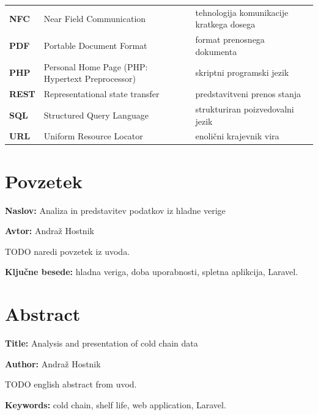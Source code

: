 \documentclass[a4paper, 12pt]{book}
\newcommand{\ttitle}{Analiza in predstavitev podatkov iz hladne verige}
\newcommand{\ttitleEn}{Analysis and presentation of cold chain data}
\newcommand{\tauthor}{Andraž Hostnik}
\newcommand{\tkeywords}{hladna veriga, doba uporabnosti, spletna aplikcija, Laravel}
\newcommand{\tkeywordsEn}{cold chain, shelf life, web application, Laravel}
\newcommand{\clearemptydoublepage}{\newpage{\pagestyle{empty}\cleardoublepage}}
\begin{document}
\begin{tabular}{p{}|p{}|p{}}
  {\bf NFC} & Near Field Communication & tehnologija komunikacije kratkega dosega \\
  {\bf PDF} & Portable Document Format & format prenosnega dokumenta \\
  {\bf PHP} & Personal Home Page (PHP: Hypertext Preprocessor) & skriptni programski jezik \\
  {\bf REST} & Representational state transfer & predstavitveni prenos stanja \\
  {\bf SQL} & Structured Query Language & strukturiran poizvedovalni jezik \\
  {\bf URL} & Uniform Resource Locator & enolični krajevnik vira \\
\end{tabular}


\clearemptydoublepage

\chapter*{Povzetek}

\noindent\textbf{Naslov:} \ttitle
\bigskip

\noindent\textbf{Avtor:} \tauthor
\bigskip

\noindent TODO naredi povzetek iz uvoda.

\bigskip

\noindent\textbf{Ključne besede:} \tkeywords.
\clearemptydoublepage

\chapter*{Abstract}

\noindent\textbf{Title:} \ttitleEn
\bigskip

\noindent\textbf{Author:} \tauthor
\bigskip

\noindent TODO english abstract from uvod.
\bigskip

\noindent\textbf{Keywords:} \tkeywordsEn.
\clearemptydoublepage
\end{document}

